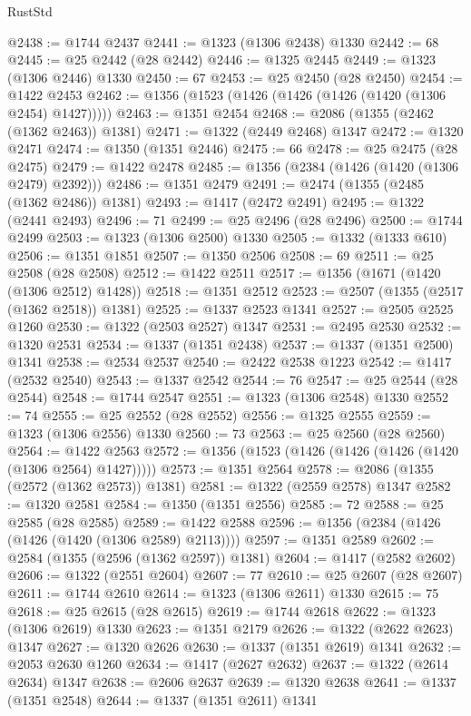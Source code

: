 \begin{lexlean}{RustStd}
\begin{coremodule}
@2438 := @1744 @2437
@2441 := @1323 (@1306 @2438) @1330
@2442 := 68
@2445 := @25 @2442 (@28 @2442)
@2446 := @1325 @2445
@2449 := @1323 (@1306 @2446) @1330
@2450 := 67
@2453 := @25 @2450 (@28 @2450)
@2454 := @1422 @2453
@2462 := @1356 (@1523 (@1426 (@1426 (@1426 (@1420 (@1306 @2454) @1427)))))
@2463 := @1351 @2454
@2468 := @2086 (@1355 (@2462 (@1362 @2463)) @1381)
@2471 := @1322 (@2449 @2468) @1347
@2472 := @1320 @2471
@2474 := @1350 (@1351 @2446)
@2475 := 66
@2478 := @25 @2475 (@28 @2475)
@2479 := @1422 @2478
@2485 := @1356 (@2384 (@1426 (@1420 (@1306 @2479) @2392)))
@2486 := @1351 @2479
@2491 := @2474 (@1355 (@2485 (@1362 @2486)) @1381)
@2493 := @1417 (@2472 @2491)
@2495 := @1322 (@2441 @2493)
@2496 := 71
@2499 := @25 @2496 (@28 @2496)
@2500 := @1744 @2499
@2503 := @1323 (@1306 @2500) @1330
@2505 := @1332 (@1333 @610)
@2506 := @1351 @1851
@2507 := @1350 @2506
@2508 := 69
@2511 := @25 @2508 (@28 @2508)
@2512 := @1422 @2511
@2517 := @1356 (@1671 (@1420 (@1306 @2512) @1428))
@2518 := @1351 @2512
@2523 := @2507 (@1355 (@2517 (@1362 @2518)) @1381)
@2525 := @1337 @2523 @1341
@2527 := @2505 @2525 @1260
@2530 := @1322 (@2503 @2527) @1347
@2531 := @2495 @2530
@2532 := @1320 @2531
@2534 := @1337 (@1351 @2438)
@2537 := @1337 (@1351 @2500) @1341
@2538 := @2534 @2537
@2540 := @2422 @2538 @1223
@2542 := @1417 (@2532 @2540)
@2543 := @1337 @2542
@2544 := 76
@2547 := @25 @2544 (@28 @2544)
@2548 := @1744 @2547
@2551 := @1323 (@1306 @2548) @1330
@2552 := 74
@2555 := @25 @2552 (@28 @2552)
@2556 := @1325 @2555
@2559 := @1323 (@1306 @2556) @1330
@2560 := 73
@2563 := @25 @2560 (@28 @2560)
@2564 := @1422 @2563
@2572 := @1356 (@1523 (@1426 (@1426 (@1426 (@1420 (@1306 @2564) @1427)))))
@2573 := @1351 @2564
@2578 := @2086 (@1355 (@2572 (@1362 @2573)) @1381)
@2581 := @1322 (@2559 @2578) @1347
@2582 := @1320 @2581
@2584 := @1350 (@1351 @2556)
@2585 := 72
@2588 := @25 @2585 (@28 @2585)
@2589 := @1422 @2588
@2596 := @1356 (@2384 (@1426 (@1426 (@1420 (@1306 @2589) @2113))))
@2597 := @1351 @2589
@2602 := @2584 (@1355 (@2596 (@1362 @2597)) @1381)
@2604 := @1417 (@2582 @2602)
@2606 := @1322 (@2551 @2604)
@2607 := 77
@2610 := @25 @2607 (@28 @2607)
@2611 := @1744 @2610
@2614 := @1323 (@1306 @2611) @1330
@2615 := 75
@2618 := @25 @2615 (@28 @2615)
@2619 := @1744 @2618
@2622 := @1323 (@1306 @2619) @1330
@2623 := @1351 @2179
@2626 := @1322 (@2622 @2623) @1347
@2627 := @1320 @2626
@2630 := @1337 (@1351 @2619) @1341
@2632 := @2053 @2630 @1260
@2634 := @1417 (@2627 @2632)
@2637 := @1322 (@2614 @2634) @1347
@2638 := @2606 @2637
@2639 := @1320 @2638
@2641 := @1337 (@1351 @2548)
@2644 := @1337 (@1351 @2611) @1341

\end{coremodule}
\end{lexlean}

